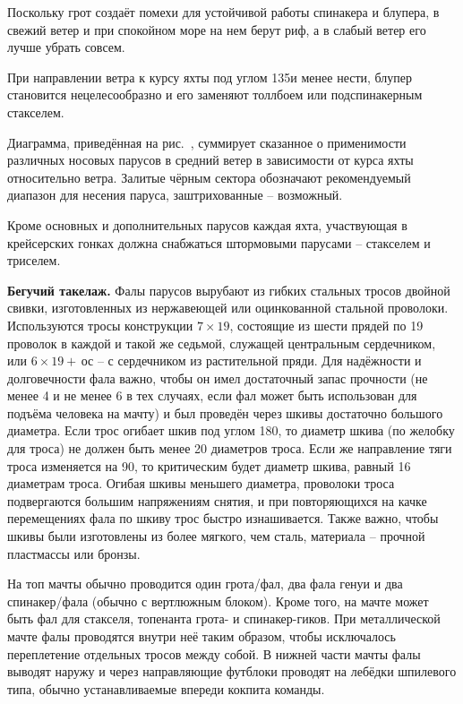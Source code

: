 Поскольку грот создаёт помехи для устойчивой работы спинакера и
блупера, в свежий ветер и при спокойном море на нем берут риф, а в
слабый ветер его лучше убрать совсем.

При направлении ветра к курсу яхты под углом 135\gr и менее нести,
блупер становится нецелесообразно и его заменяют толлбоем или
подспинакерным стакселем.
 
Диаграмма, приведённая на рис.~, суммирует сказанное о
применимости различных носовых парусов в средний ветер в зависимости
от курса яхты относительно ветра. Залитые чёрным сектора обозначают
рекомендуемый диапазон для несения паруса, заштрихованные \---
возможный.

Кроме основных и дополнительных парусов каждая яхта, участвующая в
крейсерских гонках должна снабжаться штормовыми парусами \---
стакселем и триселем.

\textbf{Бегучий такелаж.}
Фалы парусов вырубают из гибких
стальных тросов двойной свивки, изготовленных из нержавеющей или
оцинкованной стальной проволоки. Используются тросы конструкции
$7 \times 19$, состоящие из шести прядей по 19 проволок в каждой и
такой же седьмой, служащей центральным сердечником, или
$6 \times 19 + $\,ос \--- с сердечником из растительной пряди. Для
надёжности и долговечности фала важно, чтобы он имел достаточный запас
прочности (не менее 4 и не менее 6 в тех случаях, если фал может быть
использован для подъёма человека на мачту) и был проведён через шкивы
достаточно большого диаметра. Если трос огибает шкив под углом 180\gr,
то диаметр шкива (по желобку для троса) не должен быть менее 20
диаметров троса. Если же направление тяги троса изменяется на 90\gr,
то критическим будет диаметр шкива, равный 16 диаметрам троса. Огибая
шкивы меньшего диаметра, проволоки троса подвергаются большим
напряжениям снятия, и при повторяющихся на качке перемещениях фала по
шкиву трос быстро изнашивается. Также важно, чтобы шкивы были
изготовлены из более мягкого, чем сталь, материала \--- прочной
пластмассы или бронзы.

На топ мачты обычно проводится один грота\-/фал, два фала генуи и два
спинакер\-/фала (обычно с вертлюжным блоком). Кроме того, на мачте
может быть фал для стакселя, топенанта грота- и спинакер-гиков. При
металлической мачте фалы проводятся внутри неё таким образом, чтобы
исключалось переплетение отдельных тросов между собой. В нижней части
мачты фалы выводят наружу и через направляющие футблоки проводят на
лебёдки шпилевого типа, обычно устанавливаемые впереди кокпита
команды.

